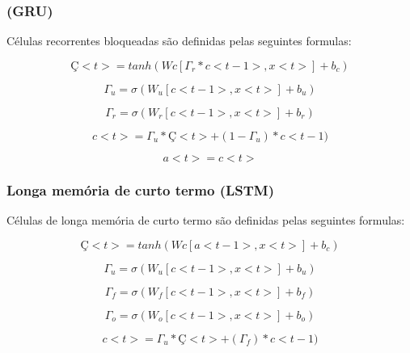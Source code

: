 \documentclass[12pt]{article}
\begin{document}
\subsubsection{(GRU)}
Células recorrentes bloqueadas são definidas pelas seguintes formulas:

\begin{equation}
    Ç<t> = tanh(Wc[\Gamma_r * c<t-1>, x<t>]+b_c)
\end{equation}

\begin{equation}
    \Gamma_u = \sigma(W_u[c<t-1>, x<t>]+b_u)
\end{equation}

\begin{equation}
    \Gamma_r = \sigma(W_r[c<t-1>, x<t>]+b_r)
\end{equation}

\begin{equation}
    c<t>=\Gamma_u*Ç<t>+(1-\Gamma_u)*c<t-1)
\end{equation}

\begin{equation}
    a<t>=c<t>
\end{equation}

\subsubsection{Longa memória de curto termo (LSTM)}

Células de longa memória de curto termo são definidas pelas seguintes formulas:

\begin{equation}
    Ç<t> = tanh(Wc[a<t-1>, x<t>]+b_c)
\end{equation}

\begin{equation}
    \Gamma_u = \sigma(W_u[c<t-1>, x<t>]+b_u)
\end{equation}

\begin{equation}
    \Gamma_f = \sigma(W_f[c<t-1>, x<t>]+b_f)
\end{equation}

\begin{equation}
    \Gamma_o = \sigma(W_o[c<t-1>, x<t>]+b_o)
\end{equation}

\begin{equation}
    c<t>=\Gamma_u*Ç<t>+(\Gamma_f)*c<t-1)
\end{equation}
\end{document}
